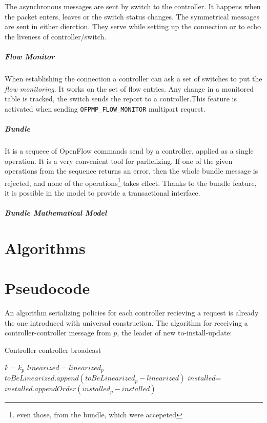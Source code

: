 \documentclass{article}
\theoremstyle{remark}
\begin{document}
The asynchronous messages are sent by switch to the controller. It happens when the packet enters, leaves or the switch status changes.  The symmetrical messages are sent in either dierction. They serve while setting up the connection or to echo the liveness of controller/switch. 
\subparagraph{Flow Monitor}  When establishing the connection a controller can ask a set of switches to put the \emph{flow monitoring}. It works on the set of flow entries. Any change in a monitored table is tracked, the switch sends the report to a controller.This feature is activated when sending 
\texttt{OFPMP\_FLOW\_MONITOR} multipart request.  
\subparagraph{Bundle} It is a sequece of OpenFlow commands send by a 
controller, applied as a single operation. It is a very convenient tool for parllelizing. If one of the given operations from the sequence returns an error, then the whole bundle message is rejected, and none of the operations\footnote{even those, from the bundle, which were accepeted} takes effect. 
Thanks to the bundle feature, it is possible in the model to provide a transactional interface.
\subparagraph{Bundle Mathematical Model}
\section{Algorithms}
%

%
\section{Pseudocode}

%
An algorithm serializing policies for each controller recieving a request is already the one introduced with universal construction.
The algorithm for receiving a controller-controller message from $p$, the leader of new to-install-update:
\begin{algorithm}
\caption{Controller-controller broadcast}\label{BroadcastCC}
  \begin{algorithmic}[1]
     $k=k_p$
    \EndIf
     $linearized = linearized_p$
    \EndIf
    \State $toBeLinearized.append(toBeLinearized_p-linearized)$
    \State $installed$=$installed.appendOrder(installed_p-installed)$
    \EndProcedure
  \end{algorithmic}
\end{algorithm}
\end{document}
